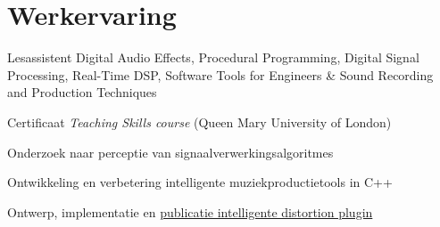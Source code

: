 \documentclass[a4paper]{deedy-resume} %
\begin{document}
\begin{minipage}[t]{0.65\textwidth} %


\section{Werkervaring}

\hspace{-0.1cm}
\vspace{\topsep} %
\begin{tightitemize}
\item Lesassistent Digital Audio Effects, Procedural Programming, Digital Signal Processing, Real-Time DSP, Software Tools for Engineers \& Sound Recording and Production Techniques
\item Certificaat  \emph{Teaching Skills course} (Queen Mary University of London)
\end{tightitemize}
\sectionspace %


\hspace{-0.1cm}
\begin{tightitemize}
\item Onderzoek naar perceptie van signaalverwerkingsalgoritmes %
\item Ontwikkeling en verbetering intelligente muziekproductietools in C++ %
\item Ontwerp, implementatie en \href{http://brechtdeman.com/publications/aes53.pdf}{publicatie intelligente distortion plugin}
\end{tightitemize}
\sectionspace %



\end{minipage}
\end{document}
